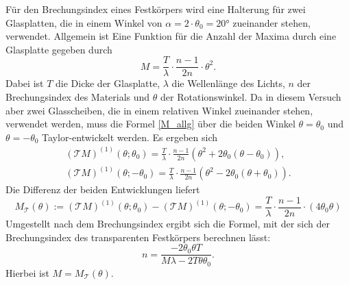Für den Brechungsindex eines Festkörpers wird eine Halterung für zwei Glasplatten,
die in einem Winkel von $\alpha = 2\cdot\theta_0 = 20°$ zueinander stehen, verwendet.
Allgemein ist Eine Funktion für die Anzahl der Maxima durch eine Glasplatte gegeben durch
\begin{equation}
  M = \frac{T}{\lambda}\cdot\frac{n-1}{2n}\cdot\theta^2.
\label{M_allg}
\end{equation}
Dabei ist $T$ die Dicke der Glasplatte, $\lambda$ die Wellenlänge des Lichts, $n$ der Brechungsindex des Materials und $\theta$ der Rotationswinkel.
Da in diesem Versuch aber zwei Glasscheiben, die in einem relativen Winkel zueinander stehen, verwendet werden,
muss die Formel \eqref{M_allg} über die beiden Winkel $\theta = \theta_0$ und $\theta = -\theta_0$ Taylor-entwickelt werden.
Es ergeben sich
\begin{gather*}
  (\mathcal{T}M)^{(1)}(\theta;\theta_0) = \frac{T}{\lambda}\cdot\frac{n-1}{2n}(\theta^2 + 2\theta_0(\theta-\theta_0)),\\
  (\mathcal{T}M)^{(1)}(\theta;-\theta_0) = \frac{T}{\lambda}\cdot\frac{n-1}{2n}(\theta^2 - 2\theta_0(\theta+\theta_0)).
\end{gather*}
Die Differenz der beiden Entwicklungen liefert
\begin{equation*}
  M_{\mathcal{T}}(\theta) :=
  (\mathcal{T}M)^{(1)}(\theta;\theta_0) - (\mathcal{T}M)^{(1)}(\theta;-\theta_0)
   = \frac{T}{\lambda}\cdot\frac{n-1}{2n}\cdot(4\theta_0\theta)
 \end{equation*}
 Umgestellt nach dem Brechungsindex ergibt sich die Formel,
 mit der sich der Brechungsindex des transparenten Festkörpers berechnen lässt:
\begin{equation}
  n = \frac{-2 \theta_0\theta T}{M\lambda - 2 T\theta\theta_0}.
\label{eqn:glas}
\end{equation}
Hierbei ist $M = M_{\mathcal{T}}(\theta)$.
